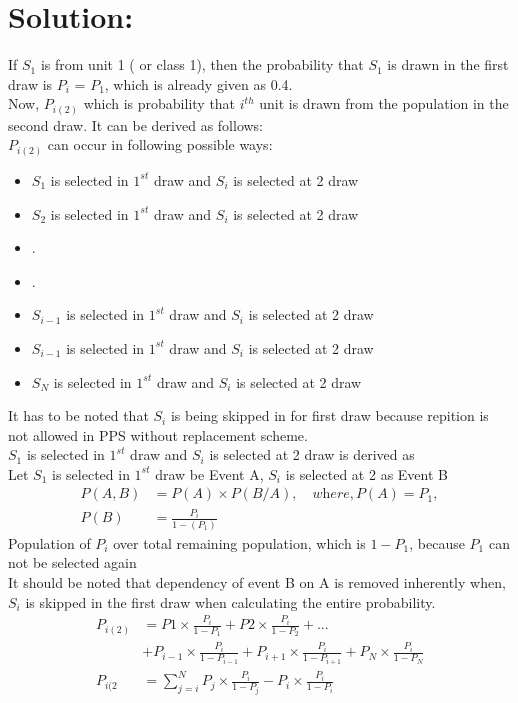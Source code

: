 \documentclass{article}
\begin{document}
\section{Solution:}
If $S_1$ is from unit 1 ( or class 1), then the probability that $S_1$ is drawn in the first draw is $P_i$ = $P_1$, which is already given as 0.4.\\
Now, $P_{i(2)}$ which is probability that $i^{th}$ unit is drawn from the population in the second draw. It can be derived as follows:\\
$P_{i(2)}$ can occur in following possible ways:\\
\begin{itemize}
    \item $S_1$ is selected in $1^{st}$ draw and $S_i$ is selected at 2 draw
    \item $S_2$ is selected in $1^{st}$ draw and $S_i$ is selected at 2 draw
    \item .
    \item .
    \item $S_{i-1}$ is selected in $1^{st}$ draw and $S_i$ is selected at 2 draw
    \item $S_{i-1}$ is selected in $1^{st}$ draw and $S_i$ is selected at 2 draw
    \item $S_{N}$ is selected in $1^{st}$ draw and $S_i$ is selected at 2 draw
\end{itemize}
It has to be noted that $S_i$ is being skipped in for first draw because repition is not allowed in PPS without replacement scheme.\\
$S_1$ is selected in $1^{st}$ draw and $S_i$ is selected at 2 draw is derived as\\
Let $S_1$ is selected in $1^{st}$ draw be Event A, $S_i$ is selected at 2 as Event B
\begin{align*}
P (A,B) &= P(A) \times P(B/A), 
\quad \textit{where}, P(A) = P_1, \\
P(B) &=\frac{P_i}{1-(P_1)}
\end{align*}
Population of $P_i$ over total remaining population, which is $1 - P_1$, because $P_1$ can not be selected again\\
It should be noted that dependency of event B on A is removed inherently when, $S_i$ is skipped in the first draw when calculating the entire probability.
\begin{align*}
P_{i(2)} &= P1 \times \frac{P_i}{1-P_1} + P2 \times \frac{P_i}{1-P_2} + ... \\ &+ P_{i-1} \times \frac{P_{i}}{1-P_{i-1}} + P_{i+1} \times \frac{P_{i}}{1-P_{i+1}} + P_{N} \times \frac{P_{i}}{1-P_{N}}\\
P_{i(2} &= \sum_{j=i}^N P_j \times \frac{P_i}{1-P_j} - P_i \times \frac{P_i}{1-P_i}
\end{align*}
\end{document}
